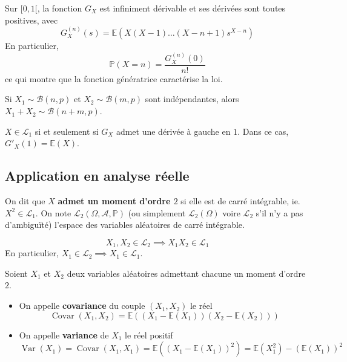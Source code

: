   \begin{theorem}
    Sur $[0,1[$, la fonction $G_X$ est infiniment dérivable et ses dérivées sont toutes positives, avec
    \[ G_X^{(n)}(s) = \mathbb{E}(X(X-1) \dots (X-n+1)s^{X-n}) \]
    En particulier,
    \[ \mathbb{P}(X=n) = \frac{G_X^{(n)}(0)}{n!} \]
    ce qui montre que la fonction génératrice caractérise la loi.
  \end{theorem}


  \begin{example}
    Si $X_1 \sim \mathcal{B}(n, p)$ et $X_2 \sim \mathcal{B}(m, p)$ sont indépendantes, alors $X_1 + X_2 \sim \mathcal{B}(n + m, p)$.
  \end{example}


  \begin{theorem}
    $X \in \mathcal{L}_1$ si et seulement si $G_X$ admet une dérivée à gauche en $1$. Dans ce cas, $G'_X(1) = \mathbb{E}(X)$.
  \end{theorem}

  \subsection{Application en analyse réelle}


  \begin{definition}
    On dit que $X$ \textbf{admet un moment d'ordre $2$} si elle est de carré intégrable, ie. $X^2 \in \mathcal{L}_1$. On note $\mathcal{L}_2(\Omega, \mathcal{A}, \mathbb{P})$ (ou simplement $\mathcal{L}_2(\Omega)$ voire $\mathcal{L}_2$ s'il n'y a pas d'ambiguïté) l'espace des variables aléatoires de carré intégrable.
  \end{definition}

  \begin{proposition}
    \[ X_1, X_2 \in \mathcal{L}_2 \implies X_1 X_2 \in \mathcal{L}_1 \]
    En particulier, $X_1 \in \mathcal{L}_2 \implies X_1 \in \mathcal{L}_1$.
  \end{proposition}

  \begin{definition}
    Soient $X_1$ et $X_2$ deux variables aléatoires admettant chacune un moment d'ordre $2$.
    \begin{itemize}
      \item On appelle \textbf{covariance} du couple $(X_1, X_2)$ le réel
      \[ \operatorname{Covar}(X_1, X_2) = \mathbb{E}((X_1 - \mathbb{E}(X_1))(X_2 - \mathbb{E}(X_2))) \]
      \item On appelle \textbf{variance} de $X_1$ le réel positif
      \[ \operatorname{Var}(X_1) = \operatorname{Covar}(X_1, X_1) = \mathbb{E}\left((X_1 - \mathbb{E}(X_1))^2\right) = \mathbb{E}(X_1^2) - (\mathbb{E}(X_1))^2  \]
    \end{itemize}
  \end{definition}

